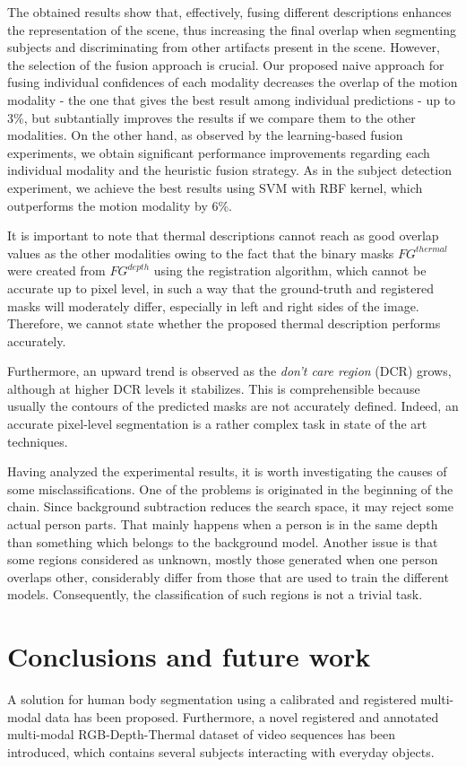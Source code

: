 \documentclass[10pt,twocolumn,letterpaper]{article}
\begin{document}
The obtained results show that, effectively, fusing different descriptions enhances the representation of the scene, thus increasing the final overlap when segmenting subjects and discriminating from other artifacts present in the scene. However, the selection of the fusion approach is crucial. Our proposed naive approach for fusing individual confidences of each modality decreases the overlap of the motion modality - the one that gives the best result among individual predictions -  up to 3\%, but subtantially improves the results if we compare them to the other modalities. On the other hand, as observed by the learning-based fusion experiments, we obtain significant performance improvements regarding each individual modality and the heuristic fusion strategy. As in the subject detection experiment, we achieve the best results using SVM with RBF kernel, which outperforms the motion modality by 6\%.

It is important to note that thermal descriptions cannot reach as good overlap values as the other modalities owing to the fact that the binary masks $FG^{thermal}$ were created from $FG^{depth}$ using the registration algorithm, which cannot be accurate up to pixel level, in such a way that the ground-truth and registered masks will moderately differ, especially in left and right sides of the image. Therefore, we cannot state whether the proposed thermal description performs accurately.

Furthermore, an upward trend is observed as the \emph{don't care region} (DCR) grows, although at higher DCR levels it stabilizes. This is comprehensible because usually the contours of the predicted masks are not accurately defined. Indeed, an accurate pixel-level segmentation is a rather complex task in state of the art techniques.

Having analyzed the experimental results, it is worth investigating the causes of some
misclassifications. One of the problems is originated in the beginning of the chain. Since
background subtraction reduces the search space, it may reject some actual person parts.
That mainly happens when a person is in the same depth than something which belongs
to the background model. Another issue is that some regions considered as unknown,
mostly those generated when one person overlaps other, considerably differ from those
that are used to train the different models. Consequently, the classification of such regions
is not a trivial task.

\section{Conclusions and future work}
\label{sec:conclusions}
A solution for human body segmentation using a calibrated and registered multi-modal data has been proposed. Furthermore, a novel registered and annotated multi-modal RGB-Depth-Thermal dataset of video sequences has been introduced, which contains several
subjects interacting with everyday objects.
\end{document}
